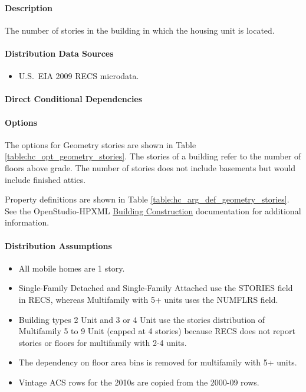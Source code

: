 \paragraph{Description}
% 
The number of stories in the building in which the housing unit is located.

\paragraph{Distribution Data Sources}
% 
\begin{itemize}
    \item U.S.~EIA 2009 RECS microdata.
\end{itemize}

\paragraph{Direct Conditional Dependencies}


\paragraph{Options}
The options for Geometry stories are shown in Table \ref{table:hc_opt_geometry_stories}. The stories of a building refer to the number of floors above grade. The number of stories does not include basements but would include finished attics.



Property definitions are shown in Table \ref{table:hc_arg_def_geometry_stories}. See the OpenStudio-HPXML \href{https://openstudio-hpxml.readthedocs.io/en/v1.10.0/workflow_inputs.html#hpxml-building-construction}{Building Construction} documentation for additional information.



\paragraph{Distribution Assumptions}
% 
\begin{itemize}
    \item All mobile homes are 1 story.
    \item Single-Family Detached and Single-Family Attached use the STORIES field in RECS, whereas Multifamily with 5+ units uses the NUMFLRS field.
    \item Building types 2 Unit and 3 or 4 Unit use the stories distribution of Multifamily 5 to 9 Unit (capped at 4 stories) because RECS does not report stories or floors for multifamily with 2-4 units.
    \item The dependency on floor area bins is removed for multifamily with 5+ units.
    \item Vintage ACS rows for the 2010s are copied from the 2000-09 rows.
\end{itemize}
